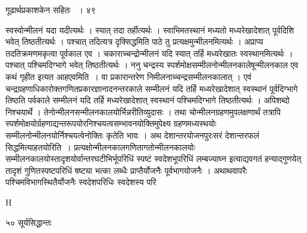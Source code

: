 \documentclass[11pt, openany]{book}
\begin{document}
\newpage

\hspace{3cm}गूढार्थप्रकाशकेन सहितः ~। \hfill ४९
\vspace{1cm}

\begin{sloppypar}
\noindent स्वस्वोन्मीलनं यदा यदीत्यर्थः । स्यात् तदा तर्हीत्यर्थः । स्वाभिमतस्थानं मध्यतो मध्यरेखादेशात् पूर्वदिशि भवेत् तिष्ठतीत्यर्थः । पश्चात् तदित्यत्र दृक्सिद्धमिति पाठे तु प्रत्यक्षमुन्मीलनमित्यर्थः । अप्राप्य तदतिक्रमणमकृत्वा पूर्वकाल एव । चकाराच्चन्द्रोन्मीलनं यदि स्यात् तर्हि मध्यरेखातः स्वस्थानमित्यर्थः । पश्चात् पश्चिमदिग्भागे भवेत् तिष्ठतीत्यर्थः । ननु चन्द्रस्य स्पर्शमोक्षसम्मीलनोन्मीलनकालेषून्मीलनकाल एव कथं गृहीत इत्यत आह\textendash एवमिति~। वा प्रकारान्तरेण निमीलनाच्चन्द्रसम्मीलनकालात् । एवं चन्द्रग्रहणाधिकारोक्तगणितप्रकारज्ञानादनन्तरकाले सम्मीलनं यदि तर्हि मध्यरेखादेशात् स्वस्थानं पूर्वदिग्भागे तिष्ठति पर्वकाले सम्मीलनं यदि तर्हि मध्यरेखादेशात् स्वस्थानं पश्चिमदिग्भागे तिष्ठतीत्यर्थः । अपिशब्दो निश्चयार्थे । तेनोन्मीलनसन्मीलनकालयोर्भिन्नरीतिव्युदासः । तथा चोन्मीलनग्रहणमुपलक्षणार्थं तत्रापि स्पर्शमोक्षयोर्ग्रहणाद्यन्तरूपयोरनिश्चयत्वसम्भावनयोक्तिमुपेक्ष्य ग्रहणमध्यस्थयोः सम्मीलनोन्मीलनयोर्निश्चयत्वेनोक्तिः कृतेति भावः । अथ देशान्तरयोजनपुरःसरं देशान्तरफलं सिद्धमित्याह\textendash तयोरिति~। प्रत्यक्षोन्मीलनकालगणितागतोन्मीलनकालयोः सम्मीलनकालयोस्तादृशयोर्वान्तरघटीभिर्भूपरिधिं स्पष्टं स्वदेशभूपरिधिं लम्बज्याघ्न इत्याद्यवगतं हन्याद्गुणयेत् तादृशं गुणितस्पष्टपरिधिं षष्ट्या भत्का लब्धैः प्राप्तैर्योजनैः पूर्वभागयोजनैः । अथाथवापरैः पश्चिमविभागस्थितैर्योजनैः स्वदेशपरिधिः स्वदेशस्य परि\textendash
\end{sloppypar}

{\tiny{H}}


\newpage

\noindent ५० \hspace{4cm} सूर्यसिद्धान्तः
\vspace{1cm}
\end{document}
